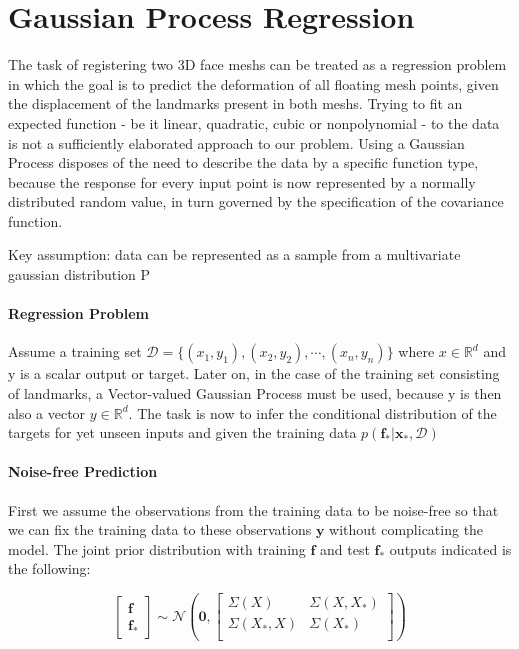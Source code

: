 \section{Gaussian Process Regression}
The task of registering two 3D face meshs can be treated as a regression problem in which the goal is to predict the deformation of all floating mesh points, given the displacement of the landmarks present in both meshs. Trying to fit an expected function - be it linear, quadratic, cubic or nonpolynomial - to the data is not a sufficiently elaborated approach to our problem. 
Using a Gaussian Process disposes of the need to describe the data by a specific function type, because the response for every input point is now represented by a normally distributed random value, in turn governed by the specification of the covariance function.

Key assumption: data can be represented as a sample from a multivariate gaussian distribution
P

\paragraph{Regression Problem}
Assume a training set $\mathcal{D} = \{(x_{1},y_{1}), (x_{2},y_{2}), \cdots, (x_{n},y_{n})\}$ where $x \in \mathbb{R}^{d}$ and y is a scalar output or target. Later on, in the case of the training set consisting of landmarks, a Vector-valued Gaussian Process must be used, because y is then also a vector $y \in \mathbb{R}^{d}$. The task is now to infer the conditional distribution of the targets for yet unseen inputs and given the training data $p(\textbf{f}_{*}\vert \textbf{x}_{*},
\mathcal{D})$

\paragraph{Noise-free Prediction}
First we assume the observations from the training data to be noise-free so that we can fix the training data to these observations $\textbf{y}$ without complicating the model. The joint prior distribution with training $\textbf{f}$ and test $\textbf{f}_{*}$ outputs indicated is the following:

\begin{equation}
\begin{bmatrix}\textbf{f}\\\textbf{f}_{*}\end{bmatrix}
\sim \mathcal{N}\left(\textbf{0},
\begin{bmatrix}
    \Sigma(X) & \Sigma(X,X_{*})\\
    \Sigma(X_{*},X) & \Sigma(X_{*})\\
\end{bmatrix}
\right)
\end{equation}

